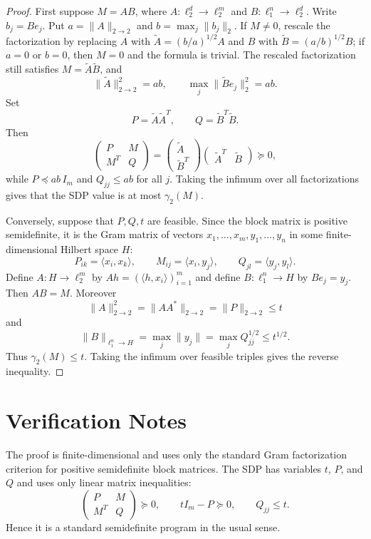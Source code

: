 \documentclass[11pt]{article}
\begin{document}
\begin{proof}
First suppose $M=AB$, where
$A:\ell_2^d\to\ell_2^m$ and $B:\ell_1^n\to\ell_2^d$.  Write
$b_j=Be_j$.  Put $a=\|A\|_{2\to2}$ and
$b=\max_j\|b_j\|_2$.  If $M\ne0$, rescale the factorization by replacing
$A$ with $\widetilde A=(b/a)^{1/2}A$ and $B$ with
$\widetilde B=(a/b)^{1/2}B$; if $a=0$ or $b=0$, then $M=0$ and the formula is
trivial.  The rescaled factorization still satisfies $M=\widetilde A\widetilde
B$, and
\[
\|\widetilde A\|_{2\to2}^2=ab,\qquad
\max_j\|\widetilde B e_j\|_2^2=ab.
\]
Set
\[
P=\widetilde A\widetilde A^T,\qquad
Q=\widetilde B^T\widetilde B .
\]
Then
\[
\begin{pmatrix}
P&M\\M^T&Q
\end{pmatrix}
=
\begin{pmatrix}
\widetilde A\\
\widetilde B^T
\end{pmatrix}
\begin{pmatrix}
\widetilde A^T&\widetilde B
\end{pmatrix}\succeq0,
\]
while $P\preceq ab\,I_m$ and $Q_{jj}\le ab$ for all $j$.  Taking the infimum
over all factorizations gives that the SDP value is at most $\gamma_2(M)$.

Conversely, suppose that $P,Q,t$ are feasible.  Since the block matrix is
positive semidefinite, it is the Gram matrix of vectors
$x_1,\ldots,x_m,y_1,\ldots,y_n$ in some finite-dimensional Hilbert space $H$:
\[
P_{ik}=\langle x_i,x_k\rangle,\qquad
M_{ij}=\langle x_i,y_j\rangle,\qquad
Q_{jl}=\langle y_j,y_l\rangle.
\]
Define $A:H\to\ell_2^m$ by
$Ah=(\langle h,x_i\rangle)_{i=1}^m$ and define
$B:\ell_1^n\to H$ by $Be_j=y_j$.  Then $AB=M$.  Moreover
\[
\|A\|_{2\to2}^2=\|AA^*\|_{2\to2}=\|P\|_{2\to2}\le t
\]
and
\[
\|B\|_{\ell_1^n\to H}=\max_j\|y_j\|=\max_j Q_{jj}^{1/2}\le t^{1/2}.
\]
Thus $\gamma_2(M)\le t$.  Taking the infimum over feasible triples gives the
reverse inequality.
\end{proof}

\section*{Verification Notes}

The proof is finite-dimensional and uses only the standard Gram factorization
criterion for positive semidefinite block matrices.  The SDP has variables
$t$, $P$, and $Q$ and uses only linear matrix inequalities:
\[
\begin{pmatrix}P&M\\M^T&Q\end{pmatrix}\succeq0,\qquad
tI_m-P\succeq0,\qquad Q_{jj}\le t.
\]
Hence it is a standard semidefinite program in the usual sense.
\end{document}
